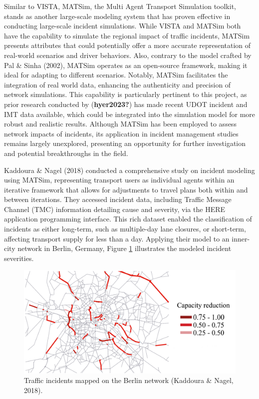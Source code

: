 \documentclass[fancy, oneside, mastersfancy, ms]{byuthesis}
\begin{document}
Similar to VISTA, MATSim, the Multi Agent Transport Simulation toolkit,
stands as another large-scale modeling system that has proven effective
in conducting large-scale incident simulations. While VISTA and MATSim
both have the capability to simulate the regional impact of traffic
incidents, MATSim presents attributes that could potentially offer a
more accurate representation of real-world scenarios and driver
behaviors. Also, contrary to the model crafted by Pal \& Sinha (2002),
MATSim operates as an open-source framework, making it ideal for
adapting to different scenarios. Notably, MATSim facilitates the
integration of real world data, enhancing the authenticity and precision
of network simulations. This capability is particularly pertinent to
this project, as prior research conducted by (\textbf{hyer2023?}) has
made recent UDOT incident and IMT data available, which could be
integrated into the simulation model for more robust and realistic
results. Although MATSim has been employed to assess network impacts of
incidents, its application in incident management studies remains
largely unexplored, presenting an opportunity for further investigation
and potential breakthroughs in the field.

Kaddoura \& Nagel (2018) conducted a comprehensive study on incident
modeling using MATSim, representing transport users as individual agents
within an iterative framework that allows for adjustments to travel
plans both within and between iterations. They accessed incident data,
including Traffic Message Channel (TMC) information detailing cause and
severity, via the HERE application programming interface. This rich
dataset enabled the classification of incidents as either long-term,
such as multiple-day lane closures, or short-term, affecting transport
supply for less than a day. Applying their model to an inner-city
network in Berlin, Germany, Figure \ref{fig-berlin-cap} illustrates the
modeled incident severities.

\begin{figure}
\centering
\includegraphics{figures/berlin_capacity.png}
\caption[Traffic incidents mapped on the Berlin network.]{Traffic incidents mapped on the Berlin network (Kaddoura \& Nagel, 2018).}
\label{fig-berlin-cap}
\end{figure}
\end{document}
